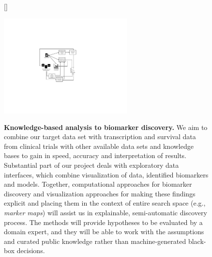 \documentclass[11pt,a4paper]{article}
\renewcommand{\bold}{\textbf}
\begin{document}
\begin{description}
\begin{figure}
[\FBwidth]
{\caption{\small\bold{Knowledge-based analysis to biomarker discovery.} We aim to combine our target data set with transcription and survival data from clinical trials with other available data sets and knowledge bases to gain in speed, accuracy and interpretation of results. Substantial part of our project deals with exploratory data interfaces, which combine visualization of data, identified biomarkers and models. Together, computational approaches for biomarker discovery and visualization approaches for making these findings explicit and placing them in the context of entire search space (e.g., {\em marker maps}) will assist us in explainable, semi-automatic discovery process. The methods will provide hypotheses to be evaluated by a domain expert, and they will be able to work with the assumptions and curated public knowledge rather than machine-generated black-box decisions.}
\label{fig:approach}}
{\includegraphics[width=0.6\textwidth]{approach}}
\end{figure}





\end{description}
\end{document}
